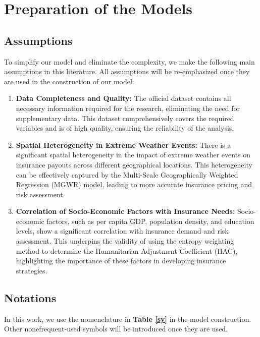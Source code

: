 \documentclass[12pt]{article}
\begin{document}
\section{Preparation of the Models}

\subsection{Assumptions}
To simplify our model and eliminate the complexity, we make the following main assumptions in this literature. All assumptions will be re-emphasized once they are used in the construction of our model:
\begin{enumerate}[\bfseries 1.]
	\item \textbf{Data Completeness and Quality: }The official dataset contains all necessary information required for the research, eliminating the need for supplementary data. This dataset comprehensively covers the required variables and is of high quality, ensuring the reliability of the analysis.
	\item \textbf{Spatial Heterogeneity in Extreme Weather Events:} There is a significant spatial heterogeneity in the impact of extreme weather events on insurance payouts across different geographical locations. This heterogeneity can be effectively captured by the Multi-Scale Geographically Weighted Regression (MGWR) model, leading to more accurate insurance pricing and risk assessment.
	\item \textbf{Correlation of Socio-Economic Factors with Insurance Needs:} Socio-economic factors, such as per capita GDP, population density, and education levels, show a significant correlation with insurance demand and risk assessment. This underpins the validity of using the entropy weighting method to determine the Humanitarian Adjustment Coefficient (HAC), highlighting the importance of these factors in developing insurance strategies.
\end{enumerate}
\subsection{Notations}
In this work, we use the nomenclature in  \textbf{Table \ref{sy}} in the model construction. Other nonefrequent-used symbols will be introduced once they are used.
\end{document}
